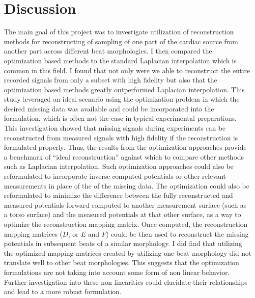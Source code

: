 \documentclass[12pt]{article}
\begin{document}
\section{Discussion}

The main goal of this project was to investigate utilization of reconstruction methods for reconstructing of sampling of one part of the cardiac source from another part across different beat morphologies. I then compared the optimization based methods to the standard Laplacian interpolation which is common in this field.  I found that not only were we able to reconstruct the entire recorded signals from only a subset with high fidelity but also that the optimization based methods greatly outperformed Laplacian interpolation. This study leveraged an ideal scenario using the optimization problem in
which the desired missing data was available and could
be incorporated into the formulation, which is often not the case in
typical experimental preparations. This investigation showed that missing signals
during experiments can be reconstructed from measured signals with high
fidelity if the reconstruction is formulated properly. Thus, the results
from the optimization approaches provide a benchmark of ``ideal
reconstruction'' against which to compare other methods such as
Laplacian interpolation.  Such optimization approaches could also be
reformulated to incorporate inverse computed potentials or other relevant
measurements in place of the of the missing data. The optimization could
also be reformulated to minimize the difference between the fully
reconstructed and measured potentials forward computed to another
measurement surface (such as a torso surface) and the measured potentials
at that other surface, as a way to optimize the reconstruction mapping
matrix. Once computed, the reconstruction mapping matrices ($D$, or $E$ and
$F$) could be then used to reconstruct the missing potentials in
subsequent beats of a similar morphology. I did find that utilizing the optimized mapping matrices  created by utilizing one beat morphology did not translate well to other beat morphologies. This suggests that the optimization formulations are not taking into account some form of non linear behavior. Further investigation into these non linearities could elucidate their relationships and lead to a more robust formulation. 
\end{document}
